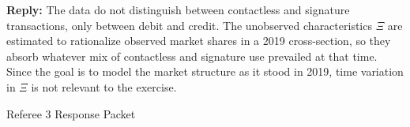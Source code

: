 \documentclass[main.tex]{subfiles}
\begin{document}
\begin{refsection}
\begin{refcommentnoclear}
\end{refcommentnoclear}

\textbf{Reply:} The data do not distinguish between contactless and signature transactions, only between debit and credit.
The unobserved characteristics $\Xi$ are estimated to rationalize observed market shares in a 2019 cross-section, so they absorb whatever mix of contactless and signature use prevailed at that time.
Since the goal is to model the market structure as it stood in 2019, time variation in $\Xi$ is not relevant to the exercise.

\printbibliography
\end{refsection}

\clearpage

{\color{white}\fontsize{1}{1}\selectfont Referee 3 Response Packet}

\newpage
\end{document}
